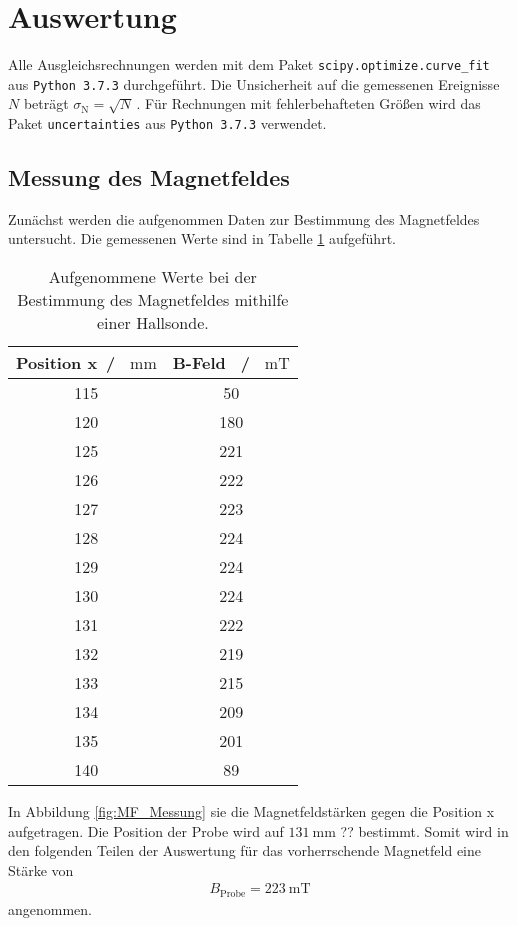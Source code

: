\section{Auswertung}
Alle Ausgleichsrechnungen werden mit dem Paket \texttt{scipy.optimize.curve\_fit}  aus \texttt{Python 3.7.3} durchgeführt.
Die Unsicherheit auf die gemessenen Ereignisse $N$ beträgt $\sigma_\text{N} = \sqrt{N}\,$.
Für Rechnungen mit fehlerbehafteten Größen wird das Paket \texttt{uncertainties} aus \texttt{Python 3.7.3} verwendet.

\subsection{Messung des Magnetfeldes}
Zunächst werden die aufgenommen Daten zur Bestimmung des Magnetfeldes untersucht. Die gemessenen Werte 
sind in Tabelle \ref{tab:MF_Messung} aufgeführt. 
\begin{table}[H]
    \centering
    \caption{Aufgenommene Werte bei der Bestimmung des Magnetfeldes mithilfe einer Hallsonde.}
    \label{tab:MF_Messung}
    \begin{tabular}{cc}
      \toprule
      Position x\, / \, $\si{\milli\meter}$ & B-Feld \, / \, $\si{\milli\tesla}$  \\
      \midrule
      115 & 50  \\
      120 & 180 \\
      125 & 221 \\
      126 & 222 \\
      127 & 223 \\
      128 & 224 \\
      129 & 224 \\
      130 & 224 \\
      131 & 222 \\
      132 & 219 \\
      133 & 215 \\
      134 & 209 \\
      135 & 201 \\
      140 & 89  \\
      \bottomrule
  \end{tabular}
 \end{table} \noindent
 In Abbildung \ref{fig:MF_Messung} sie die Magnetfeldstärken gegen die Position x aufgetragen. 
 Die Position der Probe wird auf $\SI{131}{\milli\meter}$ ?? bestimmt. Somit wird in den folgenden Teilen der 
 Auswertung für das vorherrschende Magnetfeld eine Stärke von 
 \begin{align*}
     B_\text{Probe} = \SI{223}{\milli\tesla}
 \end{align*} \noindent
 angenommen. 

